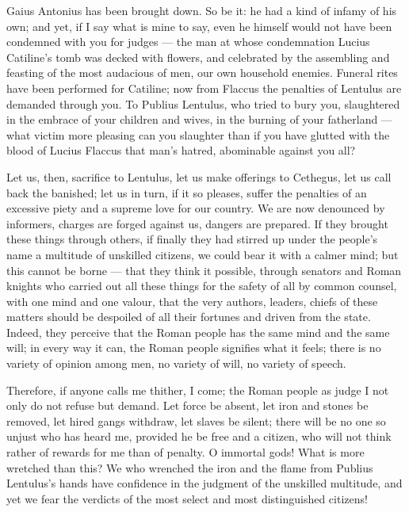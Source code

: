  Gaius Antonius has been brought down. So be it: he had a kind of infamy of his own; and yet, if I say what is mine to say, even he himself would not have been condemned with you for judges --- the man at whose condemnation Lucius Catiline's tomb was decked with flowers, and celebrated by the assembling and feasting of the most audacious of men, our own household enemies. Funeral rites have been performed for Catiline; now from Flaccus the penalties of Lentulus are demanded through you. To Publius Lentulus, who tried to bury you, slaughtered in the embrace of your children and wives, in the burning of your fatherland --- what victim more pleasing can you slaughter than if you have glutted with the blood of Lucius Flaccus that man's hatred, abominable against you all?

 Let us, then, sacrifice to Lentulus, let us make offerings to Cethegus, let us call back the banished; let us in turn, if it so pleases, suffer the penalties of an excessive piety and a supreme love for our country. We are now denounced by informers, charges are forged against us, dangers are prepared. If they brought these things through others, if finally they had stirred up under the people's name a multitude of unskilled citizens, we could bear it with a calmer mind; but this cannot be borne --- that they think it possible, through senators and Roman knights who carried out all these things for the safety of all by common counsel, with one mind and one valour, that the very authors, leaders, chiefs of these matters should be despoiled of all their fortunes and driven from the state. Indeed, they perceive that the Roman people has the same mind and the same will; in every way it can, the Roman people signifies what it feels; there is no variety of opinion among men, no variety of will, no variety of speech.

 Therefore, if anyone calls me thither, I come; the Roman people as judge I not only do not refuse but demand. Let force be absent, let iron and stones be removed, let hired gangs withdraw, let slaves be silent; there will be no one so unjust who has heard me, provided he be free and a citizen, who will not think rather of rewards for me than of penalty. O immortal gods! What is more wretched than this? We who wrenched the iron and the flame from Publius Lentulus's hands have confidence in the judgment of the unskilled multitude, and yet we fear the verdicts of the most select and most distinguished citizens!

